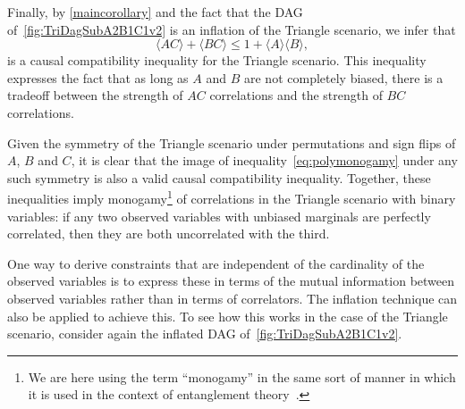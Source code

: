 {Finally, by \cref{maincorollary} and the fact that the DAG of~\cref{fig:TriDagSubA2B1C1v2} is an inflation of the Triangle scenario, we infer that 
\begin{equation}
	\label{eq:polymonogamy}
	\langle A C\rangle + \langle B C\rangle \leq 1 + \langle A\rangle \langle B\rangle,
\end{equation}
is a causal compatibility inequality for the Triangle scenario.   This inequality expresses the fact that as long as $A$ and $B$ are not completely biased, there is a tradeoff between the strength of $AC$ correlations and the strength of $BC$ correlations.   

Given the symmetry of the Triangle scenario under permutations and sign flips of $A$, $B$ and $C$, it is clear that the image of inequality~\cref{eq:polymonogamy} under any such symmetry is also a valid causal compatibility inequality.  Together, these inequalities imply monogamy\footnote{We are here using the term ``monogamy'' in the same sort of manner in which it is used in the context of entanglement theory~\cite{horo4}.}  of correlations in the Triangle scenario with binary variables:  if any two observed variables with unbiased marginals are perfectly correlated, then they are both uncorrelated with the third.




\smallskip\nobreak

One way to derive constraints that are independent of the cardinality of the observed variables is to express these in terms of the mutual information between observed variables rather than in terms of correlators.  The inflation technique can also be applied to achieve this.
To see how this works in the case of the Triangle scenario, consider again the inflated DAG of~\cref{fig:TriDagSubA2B1C1v2}.  

}
